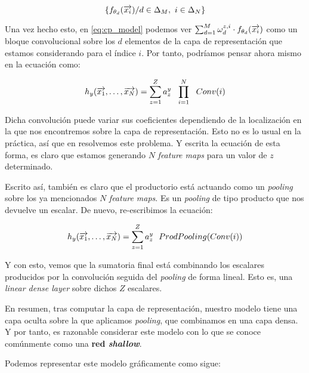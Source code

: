 $$\{f_{\theta_d}(\overrightarrow{x_i}) / d \in \Delta_{M},\ i \in \Delta_{N} \}$$

Una vez hecho esto, en \eqref{eq:cp_model} podemos ver $\sum_{d = 1}^{M} \omega^{z, i}_d \cdot f_{\theta_{d}}(\overrightarrow{x_i})$ como un bloque convolucional sobre los $d$ elementos de la capa de representación que estamos considerando para el índice $i$. Por tanto, podríamos pensar ahora mismo en la ecuación como:

\begin{equation}
    h_y(\overrightarrow{x_1}, \ldots, \overrightarrow{x_N}) =  \sum_{z = 1}^Z a_z^y \ \  \prod_{i = 1}^N \ \  Conv(i)
\end{equation}

Dicha convolución puede variar sus coeficientes dependiendo de la localización en la que nos encontremos sobre la capa de representación. Esto no es lo usual en la práctica, así que en  resolvemos este problema. Y escrita la ecuación de esta forma, es claro que estamos generando $N$ \textit{feature maps} para un valor de $z$ determinado.

Escrito así, también es claro que el productorio está actuando como un \textit{pooling} sobre los ya mencionados $N$ \textit{feature maps}. Es un \textit{pooling} de tipo producto que nos devuelve un escalar. De nuevo, re-escribimos la ecuación:

\begin{equation}
    h_y(\overrightarrow{x_1}, \ldots, \overrightarrow{x_N}) =  \sum_{z = 1}^Z a_z^y \ \  ProdPooling( Conv(i) )
\end{equation}

Y con esto, vemos que la sumatoria final está combinando los escalares producidos por la convolución seguida del \textit{pooling} de forma lineal. Esto es, una \textit{linear dense layer} sobre dichos $Z$ escalares.

En resumen, tras computar la capa de representación, nuestro modelo tiene una capa oculta sobre la que aplicamos \textit{pooling}, que combinamos en una capa densa. Y por tanto, es razonable considerar este modelo con lo que se conoce comúnmente como una \textbf{red \textit{shallow}}.

Podemos representar este modelo gráficamente como sigue:

